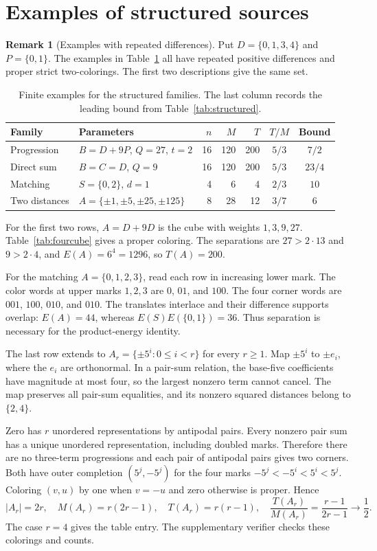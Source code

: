 \documentclass[11pt,a4paper]{article}
\theoremstyle{definition}
\newtheorem*{remark}{Remark}
\numberwithin{equation}{section}
\begin{document}
\section{Examples of structured sources}\label{app:structured-examples}
\begin{remark}[Examples with repeated differences]\label{rem:structured-examples}
Put $D=\{0,1,3,4\}$ and $P=\{0,1\}$. The examples in Table~\ref{tab:structured-examples} all have repeated positive differences and proper strict two-colorings. The first two descriptions give the same set.
\begin{table}[htbp]
\centering
\caption{Finite examples for the structured families. The last column records the leading bound from Table~\ref{tab:structured}.}
\label{tab:structured-examples}
\small
\begin{tabular}{@{}llrrrcc@{}}
\toprule Family & Parameters & $n$ & $M$ & $T$ & $T/M$ & Bound\\\midrule
Progression & $B=D+9P$, $Q=27$, $t=2$ &16&120&200&$5/3$&$7/2$\\
Direct sum & $B=C=D$, $Q=9$ &16&120&200&$5/3$&$23/4$\\
Matching & $S=\{0,2\}$, $d=1$ &4&6&4&$2/3$&$10$\\
Two distances & $A=\{\pm1,\pm5,\pm25,\pm125\}$ &8&28&12&$3/7$&$6$\\
\bottomrule
\end{tabular}
\end{table}
For the first two rows, $A=D+9D$ is the cube with weights $1,3,9,27$. Table~\ref{tab:fourcube} gives a proper coloring. The separations are $27>2\cdot13$ and $9>2\cdot4$, and $E(A)=6^4=1296$, so $T(A)=200$.

For the matching $A=\{0,1,2,3\}$, read each row in increasing lower mark. The color words at upper marks $1,2,3$ are $0$, $01$, and $100$. The four corner words are $001$, $100$, $010$, and $010$. The translates interlace and their difference supports overlap: $E(A)=44$, whereas $E(S)E(\{0,1\})=36$. Thus separation is necessary for the product-energy identity.

The last row extends to $A_r=\{\pm5^i:0\le i<r\}$ for every $r\ge1$. Map $\pm5^i$ to $\pm e_i$, where the $e_i$ are orthonormal. In a pair-sum relation, the base-five coefficients have magnitude at most four, so the largest nonzero term cannot cancel. The map preserves all pair-sum equalities, and its nonzero squared distances belong to $\{2,4\}$.

Zero has $r$ unordered representations by antipodal pairs. Every nonzero pair sum has a unique unordered representation, including doubled marks. Therefore there are no three-term progressions and each pair of antipodal pairs gives two corners. Both have outer completion $(5^j,-5^j)$ for the four marks $-5^j<-5^i<5^i<5^j$. Coloring $(v,u)$ by one when $v=-u$ and zero otherwise is proper. Hence
\begin{equation}\label{eq:antipodal-counts}
|A_r|=2r,\quad M(A_r)=r(2r-1),\quad T(A_r)=r(r-1),\quad
\frac{T(A_r)}{M(A_r)}=\frac{r-1}{2r-1}\longrightarrow\frac12.
\end{equation}
The case $r=4$ gives the table entry. The supplementary verifier checks these colorings and counts.
\end{remark}
\end{document}

